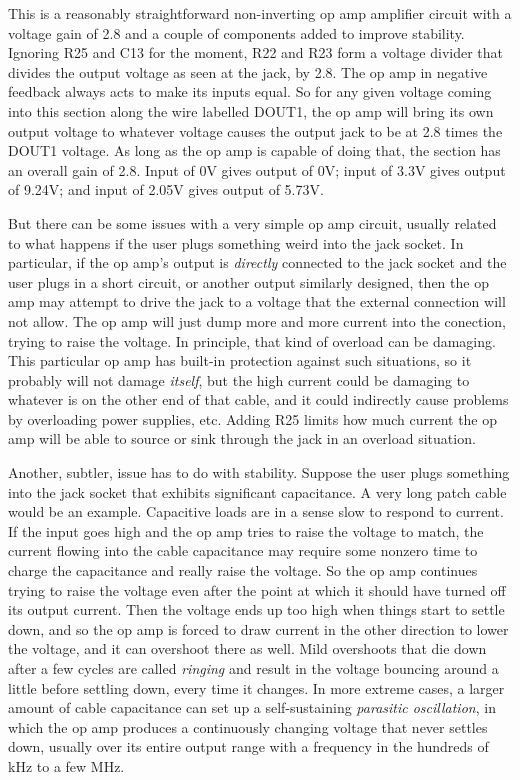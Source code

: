 This is a reasonably straightforward non-inverting op amp amplifier circuit
with a voltage gain of 2.8 and a couple of components added to improve
stability.  Ignoring R25 and C13 for the moment, R22 and R23 form a voltage
divider that divides the output voltage as seen at the jack, by 2.8.  The op
amp in negative feedback always acts to make its inputs equal.  So for any
given voltage coming into this section along the wire labelled DOUT1, the op
amp will bring its own output voltage to whatever voltage causes the output
jack to be at 2.8 times the DOUT1 voltage.  As long as the op amp is capable
of doing that, the section has an overall gain of 2.8.  Input of 0V gives
output of 0V; input of 3.3V gives output of 9.24V; and input of 2.05V gives
output of 5.73V.

But there can be some issues with a very simple op amp circuit, usually
related to what happens if the user plugs something weird into the jack
socket.  In particular, if the op amp's output is \emph{directly} connected
to the jack socket and the user plugs in a short circuit, or another output
similarly designed, then the op amp may attempt to drive the jack to a
voltage that the external connection will not allow.  The op amp will just
dump more and more current into the conection, trying to raise the voltage. 
In principle, that kind of overload can be damaging.  This particular op amp
has built-in protection against such situations, so it probably will not
damage \emph{itself}, but the high current could be damaging to whatever is
on the other end of that cable, and it could indirectly cause problems by
overloading power supplies, etc.  Adding R25 limits how much current the op
amp will be able to source or sink through the jack in an overload
situation.

Another, subtler, issue has to do with stability.  Suppose the user plugs
something into the jack socket that exhibits significant capacitance.  A
very long patch cable would be an example.  Capacitive loads are in a sense
slow to respond to current.  If the input goes high and the op amp tries to
raise the voltage to match, the current flowing into the cable capacitance
may require some nonzero time to charge the capacitance and really raise the
voltage.  So the op amp continues trying to raise the voltage even after the
point at which it should have turned off its output current.  Then the
voltage ends up too high when things start to settle down, and so the op amp
is forced to draw current in the other direction to lower the voltage, and
it can overshoot there as well.  Mild overshoots that die down after a few
cycles are called \emph{ringing} and result in the voltage bouncing around a
little before settling down, every time it changes.  In more extreme cases,
a larger amount of cable capacitance can set up a self-sustaining
\emph{parasitic oscillation}, in which the op amp produces a continuously
changing voltage that never settles down, usually over its entire output
range with a frequency in the hundreds of kHz to a few MHz.


